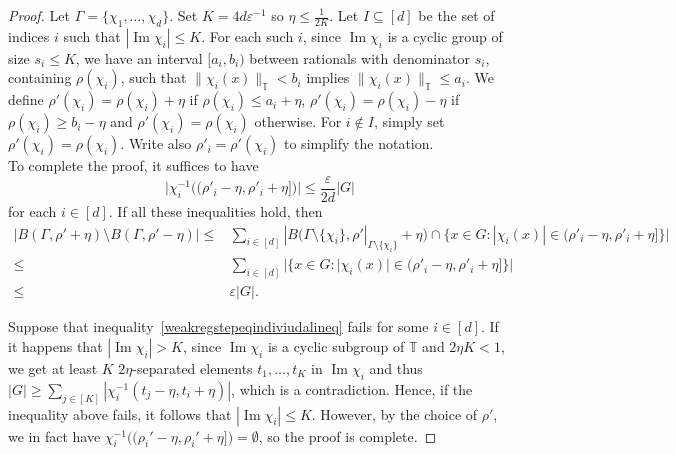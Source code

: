 \documentclass[a4paper,11pt]{article}
\numberwithin{theorem}{section}
\theoremstyle{definition}
\newcommand{\on}[1]{
	\operatorname{#1}
}
\begin{document}
\begin{proof}
    Let $\Gamma = \{\chi_1, \dots, \chi_d\}$. Set $K = 4d \varepsilon^{-1}$ so $\eta \leq \frac{1}{2K}$. Let $I \subseteq [d]$ be the set of indices $i$ such that $|\on{Im} \chi_i| \leq K$. For each such $i$, since $\on{Im} \chi_i$ is a cyclic group of size $s_i \leq K$, we have an interval $[a_i, b_i)$ between rationals with denominator $s_i$, containing $\rho(\chi_i)$, such that $\|\chi_i(x)\|_{\mathbb{T}} < b_i$ implies $\|\chi_i(x)\|_{\mathbb{T}} \leq a_i$. We define $\rho'(\chi_i) = \rho(\chi_i) + \eta$ if $\rho(\chi_i) \leq a_i + \eta$, $\rho'(\chi_i) = \rho(\chi_i) - \eta$ if $\rho(\chi_i) \geq b_i - \eta$ and $\rho'(\chi_i) = \rho(\chi_i)$ otherwise. For $i \notin I$, simply set $\rho'(\chi_i) = \rho(\chi_i)$. Write also $\rho'_i = \rho'(\chi_i)$ to simplify the notation.\\
    
    To complete the proof, it suffices to have
    \begin{equation}
        \Big|\chi_i^{-1}\Big((\rho'_i - \eta, \rho'_i + \eta]\Big)\Big| \leq \frac{\varepsilon}{2d}|G|\label{weakregstepeqindiviudalineq}
    \end{equation} for each $i \in [d]$. If all these inequalities hold, then
    \begin{align*}|B(\Gamma, \rho' + \eta) \setminus B(\Gamma, \rho' - \eta)| \leq &\sum_{i \in [d]} |B(\Gamma \setminus \{\chi_i\}, \rho'|_{\Gamma \setminus \{\chi_i\}} + \eta) \cap \{x \in G : |\chi_i(x)| \in (\rho'_i - \eta, \rho'_i + \eta]\}|\\
    \leq & \sum_{i \in [d]} |\{x \in G : |\chi_i(x)| \in (\rho'_i - \eta, \rho'_i + \eta]\}|
\\
\leq & \varepsilon |G|.\end{align*}

    Suppose that inequality~\eqref{weakregstepeqindiviudalineq} fails for some $i \in [d]$. If it happens that $|\on{Im} \chi_i| > K$, since $\on{Im} \chi_i$ is a cyclic subgroup of $\mathbb{T}$ and $2\eta K < 1$, we get at least $K$ $2\eta$-separated elements $t_1, \dots, t_{K}$ in $\on{Im} \chi_i$ and thus $|G| \geq\sum_{j \in [K]} |\chi_i^{-1}(t_j - \eta, t_i + \eta)|$, which is a contradiction. Hence, if the inequality above fails, it follows that $|\on{Im} \chi_i| \leq K$. However, by the choice of $\rho'$, we in fact have $\chi_i^{-1}\Big((\rho_i' - \eta, \rho_i' + \eta]\Big) = \emptyset$, so the proof is complete.
\end{proof}
\end{document}
